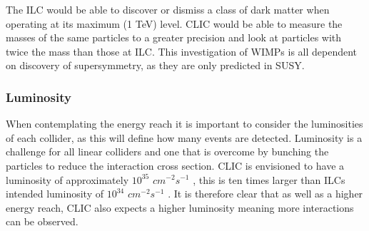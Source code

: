The ILC would be able to discover or dismiss a class of dark matter when operating at its maximum (1 TeV) level. CLIC would be able to measure the masses of the same particles to a greater precision and look at particles with twice the mass than those at ILC. This investigation of WIMPs is all dependent on discovery of supersymmetry, as they are only predicted in SUSY.

\subsubsection{Luminosity}

When contemplating the energy reach it is important to consider the luminosities of each collider, as this will define how many events are detected. Luminosity is a challenge for all linear colliders and one that is overcome by bunching the particles to reduce the interaction cross section. CLIC is envisioned to have a luminosity of approximately $10^{35}$ $cm^{-2} s^{−1}$ \cite{CLIC:Luminosity}, this is ten times larger than ILCs intended luminosity of $10^{34}$ $cm^{-2} s^{−1}$ \cite{IOP:ILC}. It is therefore clear that as well as a higher energy reach, CLIC also expects a higher luminosity meaning more interactions can be observed.



